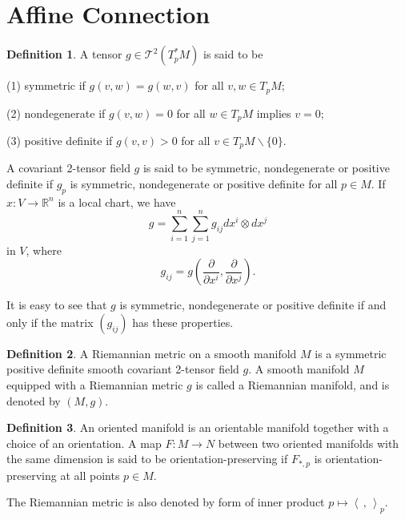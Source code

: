\documentclass[12pt,a4paper]{book}
\newenvironment{prooff}{{\noindent\it\textcolor{cyan!40!black}{Proof}:}\,}{\par}
\theoremstyle{definition}
\newtheorem{defn}{Definition}[section]
\begin{document}






\section{Affine Connection}
\begin{defn}
    A tensor $g \in \mathcal{T}^2\left(T_p^* M\right)$ is said to be

    (1) symmetric if $g(v, w)=g(w, v)$ for all $v, w \in T_p M$;

    (2) nondegenerate if $g(v, w)=0$ for all $w \in T_p M$ implies $v=0$;

    (3) positive definite if $g(v, v)>0$ for all $v \in T_p M \backslash\{0\}$.

    A covariant 2-tensor field $g$ is said to be symmetric, nondegenerate or positive definite if $g_p$ is symmetric, nondegenerate or positive definite for all $p \in M$. If $x: V \rightarrow \mathbb{R}^n$ is a local chart, we have
    $$
        g=\sum_{i=1}^n\sum_{j=1}^n g_{i j} d x^i \otimes d x^j
    $$
    in $V$, where
    $$
        g_{i j}=g\left(\frac{\partial}{\partial x^i}, \frac{\partial}{\partial x^j}\right) .
    $$

    It is easy to see that $g$ is symmetric, nondegenerate or positive definite if and only if the matrix $\left(g_{i j}\right)$ has these properties.
\end{defn}
\begin{defn}
    A Riemannian metric on a smooth manifold $M$ is a symmetric positive definite smooth covariant 2-tensor field $g$. A smooth manifold $M$ equipped with a Riemannian metric $g$ is called a Riemannian manifold, and is denoted by $(M, g)$.
\end{defn}
\begin{defn}
    An oriented manifold is an orientable manifold together
    with a choice of an orientation. A map $F: M \rightarrow N$ between two oriented manifolds with
    the same dimension is said to be orientation-preserving if $F_{*,p}$ is orientation-preserving at all points $p \in M$.

    The Riemannian metric is also denoted by form of inner product $p\mapsto 	\left \langle \,,\, \right \rangle_p$.
\end{defn}
\end{document}
